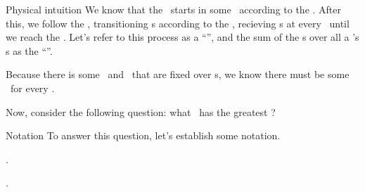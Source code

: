 \begin{part} {Physical intuition}
  We know that the \agt\ starts in some \til\ according to the \ind.
  After this, we follow the \str, 
  transitioning \til{}s according to the \trd, recieving \rwd{}s 
  at every \til\ until
  we reach the \lmt. Let's refer to this process as a ``\run'', and
  the sum of the \rwd{}s over all a \run's \til{}s
  as the ``\trwd''.

  Because there is some \ind\ and \trd\ 
  that are fixed over \run{}s, 
  we know there must be 
  some \atrwd\ for every \str.

  Now, consider the following question: 
  what \str\ has the greatest \atrwd?
\end{part}

\begin{part}{Notation}
  To answer this question, let's establish some notation.

  .

  .
  












\end{part}

